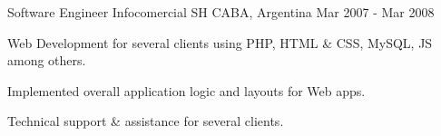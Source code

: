 \begin{cventries}
  \cventry
    {Software Engineer}
    {Infocomercial SH}
    {CABA, Argentina}
    {Mar 2007 - Mar 2008}
    {
      \begin{cvitems}
        \item {Web Development for several clients using PHP, HTML \& CSS, MySQL, JS among others.}
        \item {Implemented overall application logic and layouts for Web apps.}
        \item {Technical support \& assistance for several clients.}
      \end{cvitems}
    }

\end{cventries}
